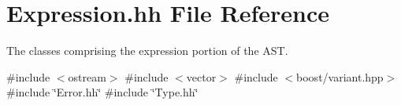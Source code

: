 \hypertarget{_expression_8hh}{}\section{Expression.\+hh File Reference}
\label{_expression_8hh}


The classes comprising the expression portion of the A\+ST.  


{\ttfamily \#include $<$ostream$>$}\newline
{\ttfamily \#include $<$vector$>$}\newline
{\ttfamily \#include $<$boost/variant.\+hpp$>$}\newline
{\ttfamily \#include \char`\"{}Error.\+hh\char`\"{}}\newline
{\ttfamily \#include \char`\"{}Type.\+hh\char`\"{}}\newline
